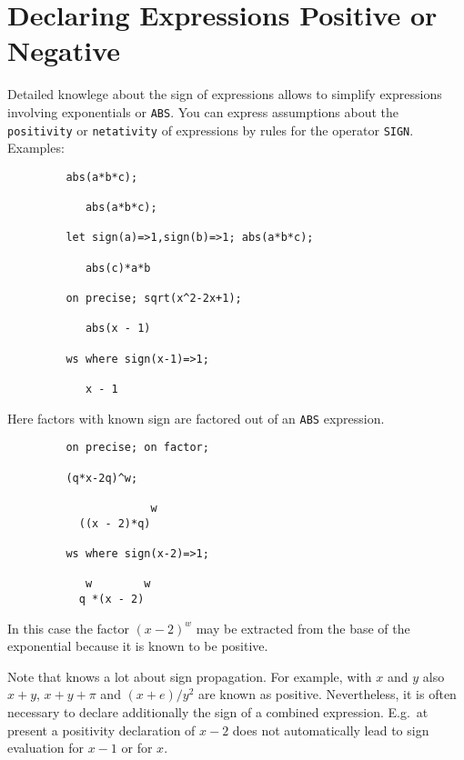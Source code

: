 \section{Declaring Expressions Positive or Negative}

Detailed knowlege about the sign of expressions allows {\REDUCE}
to simplify expressions involving exponentials or {\tt ABS}.
You can express assumptions about the 
{\tt positivity} or {\tt netativity}
of expressions by rules for the operator {\tt SIGN}.
Examples:
\begin{verbatim}
         abs(a*b*c);
      
            abs(a*b*c);

         let sign(a)=>1,sign(b)=>1; abs(a*b*c);

            abs(c)*a*b

         on precise; sqrt(x^2-2x+1);

            abs(x - 1)

         ws where sign(x-1)=>1;

            x - 1
\end{verbatim}
Here factors with known sign are factored out of an {\tt ABS} expression.
\begin{verbatim}
         on precise; on factor; 

         (q*x-2q)^w;

                      w
           ((x - 2)*q)

         ws where sign(x-2)=>1;

            w        w
           q *(x - 2)

\end{verbatim}
       
In this case the factor $(x-2)^w$ may be extracted from the base
of the exponential because it is known to be positive.

Note that {\REDUCE} knows a lot about sign propagation.
For example, with $x$ and $y$ also $x+y$, $x+y+\pi$ and $(x+e)/y^2$
are known as positive.
Nevertheless, it is often necessary to declare additionally the sign of a 
combined expression. E.g.\ at present a positivity declaration of $x-2$ does not 
automatically lead to sign evaluation for $x-1$ or for $x$.

